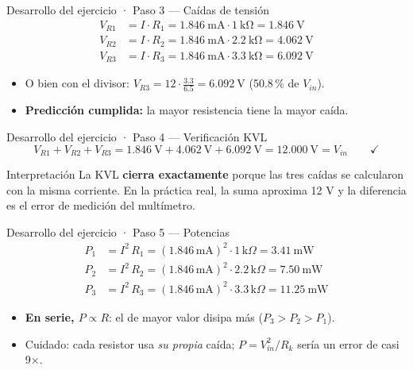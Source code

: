 \documentclass[aspectratio=169]{beamer}
\begin{document}
\begin{frame}{Desarrollo del ejercicio · Paso 3 — Caídas de tensión}
  \begin{align*}
    V_{R1} &= I\cdot R_1 = \SI{1.846}{\milli\ampere}\cdot \SI{1}{\kilo\ohm}
              = \SI{1.846}{\volt}\\[2pt]
    V_{R2} &= I\cdot R_2 = \SI{1.846}{\milli\ampere}\cdot \SI{2.2}{\kilo\ohm}
              = \SI{4.062}{\volt}\\[2pt]
    V_{R3} &= I\cdot R_3 = \SI{1.846}{\milli\ampere}\cdot \SI{3.3}{\kilo\ohm}
              = \SI{6.092}{\volt}
  \end{align*}
  \pause
  \begin{itemize}
    \item O bien con el divisor: $V_{R3} = 12\cdot \frac{3.3}{6.5} = \SI{6.092}{\volt}$ (50.8\,\% de $V_{in}$).
    \item \textbf{Predicción cumplida:} la mayor resistencia tiene la mayor caída.
  \end{itemize}
\end{frame}

\begin{frame}{Desarrollo del ejercicio · Paso 4 — Verificación KVL}
  \[
    V_{R1} + V_{R2} + V_{R3}
    = \SI{1.846}{\volt} + \SI{4.062}{\volt} + \SI{6.092}{\volt}
    = \SI{12.000}{\volt} = V_{in}
    \qquad\checkmark
  \]
  \pause
  \begin{block}{Interpretación}
    La KVL \textbf{cierra exactamente} porque las tres caídas se calcularon con la
    misma corriente. En la práctica real, la suma aproxima 12 V y la diferencia
    es el error de medición del multímetro.
  \end{block}
\end{frame}

\begin{frame}{Desarrollo del ejercicio · Paso 5 — Potencias}
  \begin{align*}
    P_1 &= I^2\,R_1 = (1.846\,\text{mA})^2\cdot 1\,\text{k}\Omega = \SI{3.41}{\milli\watt}\\[2pt]
    P_2 &= I^2\,R_2 = (1.846\,\text{mA})^2\cdot 2.2\,\text{k}\Omega = \SI{7.50}{\milli\watt}\\[2pt]
    P_3 &= I^2\,R_3 = (1.846\,\text{mA})^2\cdot 3.3\,\text{k}\Omega = \SI{11.25}{\milli\watt}
  \end{align*}
  \pause
  \begin{itemize}
    \item \textbf{En serie, $P \propto R$}: el de mayor valor disipa más ($P_3 > P_2 > P_1$).
    \item Cuidado: cada resistor usa \emph{su propia} caída; $P = V_{in}^2/R_k$ sería un error de casi 9$\times$.
  \end{itemize}
\end{frame}
\end{document}
